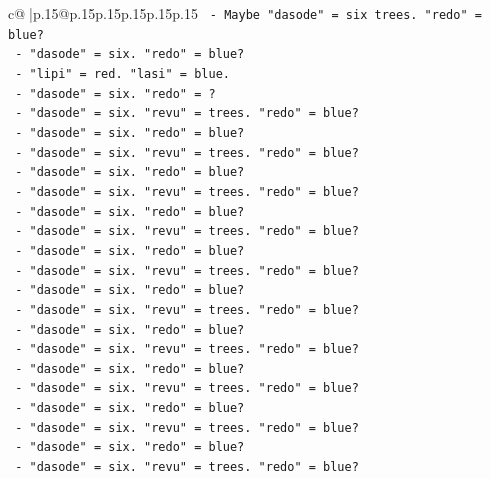 \documentclass{article}
\begin{document}
{\begin{supertabular}{c@{$\;$}|p{.15\linewidth}@{}p{.15\linewidth}p{.15\linewidth}p{.15\linewidth}p{.15\linewidth}p{.15\linewidth}}
{{{\texttt{                    {-} Maybe "dasode" = six trees. "redo" = blue?} \\
\texttt{                    {-} "dasode" = six. "redo" = blue?} \\
\texttt{                    {-} "lipi" = red. "lasi" = blue.} \\
\texttt{                    {-} "dasode" = six. "redo" = ?} \\
\texttt{                    {-} "dasode" = six. "revu" = trees. "redo" = blue?} \\
\texttt{                    {-} "dasode" = six. "redo" = blue?} \\
\texttt{                    {-} "dasode" = six. "revu" = trees. "redo" = blue?} \\
\texttt{                    {-} "dasode" = six. "redo" = blue?} \\
\texttt{                    {-} "dasode" = six. "revu" = trees. "redo" = blue?} \\
\texttt{                    {-} "dasode" = six. "redo" = blue?} \\
\texttt{                    {-} "dasode" = six. "revu" = trees. "redo" = blue?} \\
\texttt{                    {-} "dasode" = six. "redo" = blue?} \\
\texttt{                    {-} "dasode" = six. "revu" = trees. "redo" = blue?} \\
\texttt{                    {-} "dasode" = six. "redo" = blue?} \\
\texttt{                    {-} "dasode" = six. "revu" = trees. "redo" = blue?} \\
\texttt{                    {-} "dasode" = six. "redo" = blue?} \\
\texttt{                    {-} "dasode" = six. "revu" = trees. "redo" = blue?} \\
\texttt{                    {-} "dasode" = six. "redo" = blue?} \\
\texttt{                    {-} "dasode" = six. "revu" = trees. "redo" = blue?} \\
\texttt{                    {-} "dasode" = six. "redo" = blue?} \\
\texttt{                    {-} "dasode" = six. "revu" = trees. "redo" = blue?} \\
\texttt{                    {-} "dasode" = six. "redo" = blue?} \\
\texttt{                    {-} "dasode" = six. "revu" = trees. "redo" = blue?} \\
}}}
\end{supertabular}}
\end{document}
